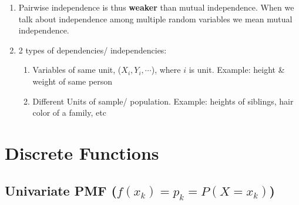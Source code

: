 \begin{enumerate}
    \item Pairwise independence is thus \textbf{weaker} than mutual independence.
    When we talk about independence among multiple random variables we mean mutual independence.
    \hfill \cite{statistics/book/Statistics-for-Data-Scientists/Maurits-Kaptein}

    \item 2 types of dependencies/ independencies:
    \begin{enumerate}
        \item Variables of same unit, ($X_i, Y_i, \cdots$), where $i$ is unit.
        Example: height \& weight of same person

        \item Different Units of sample/ population.
        Example: heights of siblings, hair color of a family, etc
    \end{enumerate}
\end{enumerate}










\section{Discrete Functions}

\subsection{Univariate PMF ($f(x_k) = p_k = P(X = x_k)$)}

